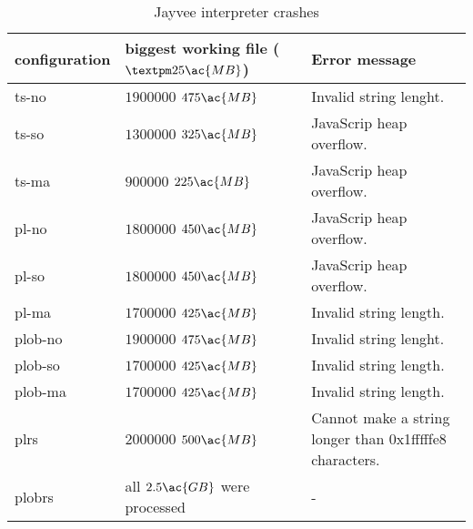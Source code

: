 \begin{table}
	\caption{Jayvee interpreter crashes}
	\label{tab:crashes}
	\begin{center}
		\begin{tabular}{|l|l|l|}
			\hline
			configuration & biggest working file ($±25\ac{MB}$) & Error message                                           \\
			\hline
			ts-no         & $1 900 000$ $475\ac{MB}$            & Invalid string lenght.                                  \\
			ts-so         & $1 300 000$ $325\ac{MB}$            & JavaScrip heap overflow.                                \\
			ts-ma         & $900 000$ $225\ac{MB}$              & JavaScrip heap overflow.                                \\
			\hline
			pl-no         & $1 800 000$ $450\ac{MB}$            & JavaScrip heap overflow.                                \\
			pl-so         & $1 800 000$ $450\ac{MB}$            & JavaScrip heap overflow.                                \\
			pl-ma         & $1 700 000$ $425\ac{MB}$            & Invalid string length.                                  \\
			\hline
			plob-no       & $1 900 000$      $475\ac{MB}$       & Invalid string lenght.                                  \\
			plob-so       & $1 700 000$   $425\ac{MB}$          & Invalid string length.                                  \\
			plob-ma       & $1 700 000$   $425\ac{MB}$          & Invalid string length.                                  \\
			\hline
			plrs          & $2 000 000$    $500\ac{MB}$         & Cannot make a string longer than 0x1fffffe8 characters. \\
			\hline
			plobrs        & all $2.5\ac{GB}$ were processed     & -                                                       \\
			\hline
		\end{tabular}
	\end{center}
\end{table}

